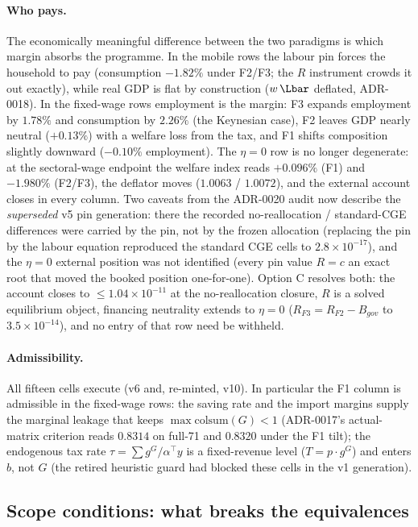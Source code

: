 \paragraph{Who pays.} The economically meaningful difference between the
two paradigms is which margin absorbs the programme. In the mobile rows the
labour pin forces the household to pay (consumption $-1.82\%$ under F2/F3;
the $R$ instrument crowds it out exactly), while real GDP is flat by
construction ($w\,\Lbar$ deflated, ADR-0018). In the fixed-wage rows
employment is the margin: F3 expands employment by $1.78\%$ and consumption
by $2.26\%$ (the Keynesian case), F2 leaves GDP nearly neutral
($+0.13\%$) with a welfare loss from the tax, and F1 shifts composition
slightly downward ($-0.10\%$ employment). The
$\eta = 0$ row is no longer degenerate: at the sectoral-wage endpoint the
welfare index reads $+0.096\%$ (F1) and $-1.980\%$ (F2/F3), the deflator
moves ($1.0063$ / $1.0072$), and the external account closes in every
column. Two caveats from the ADR-0020 audit now describe the
\emph{superseded} v5 pin generation: there the recorded
no-reallocation / standard-CGE
differences were carried by the pin, not by the frozen allocation
(replacing the pin by the labour equation reproduced the standard CGE cells
to
$2.8\times10^{-17}$), and the $\eta = 0$ external position was not
identified (every pin value $R = c$ an exact root that moved the booked
position one-for-one). Option C resolves both: the account closes to
$\le 1.04\times10^{-11}$ at the no-reallocation closure, $R$ is a solved
equilibrium object,
financing neutrality extends to $\eta = 0$ ($R_{F3} = R_{F2} - B_{gov}$ to
$3.5\times10^{-14}$), and no entry of that row need be withheld.

\paragraph{Admissibility.} All fifteen cells execute
(v6 and, re-minted, v10). In particular the F1 column is
admissible in the fixed-wage
rows: the saving rate and the import margins supply the
marginal leakage that keeps $\max \mathrm{colsum}(G) < 1$ (ADR-0017's
actual-matrix criterion reads $0.8314$ on full-71 and $0.8320$ under the F1
tilt); the endogenous tax rate $\tau = \sum g^G/\alpha^{\!\top}y$ is a
fixed-revenue level ($T = p\!\cdot\!g^G$) and enters $b$, not $G$ (the retired heuristic guard had blocked these
cells in the v1 generation).

\subsection{Scope conditions: what breaks the equivalences}\label{sec:scope}

